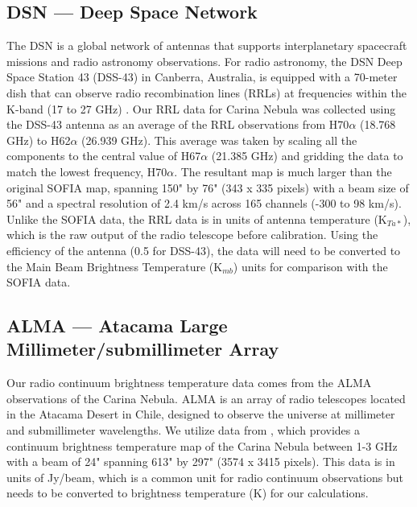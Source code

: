 \subsection{DSN --- Deep Space Network}
The DSN is a global network of antennas that supports interplanetary spacecraft missions and radio astronomy observations.
For radio astronomy, the DSN Deep Space Station 43 (DSS-43) in Canberra, Australia, is equipped with a 70-meter dish that can observe radio recombination lines (RRLs) at frequencies within the K-band (17 to 27 GHz) \citep{virkler2020broadband}.
Our RRL data for Carina Nebula was collected using the DSS-43 antenna as an average of the RRL observations from H70$\alpha$ (18.768 GHz) to H62$\alpha$ (26.939 GHz).
This average was taken by scaling all the components to the central value of H67$\alpha$ (21.385 GHz) and gridding the data to match the lowest frequency, H70$\alpha$.
The resultant map is much larger than the original SOFIA map, spanning 150" by 76" (343 x 335 pixels) with a beam size of 56" and a spectral resolution of 2.4 km/s across 165 channels (-300 to 98 km/s).
Unlike the SOFIA data, the RRL data is in units of antenna temperature (K$_{Ta*}$), which is the raw output of the radio telescope before calibration.
Using the efficiency of the antenna (0.5 for DSS-43), the data will need to be converted to the Main Beam Brightness Temperature (K$_{mb}$) units for comparison with the SOFIA data.

\subsection{ALMA --- Atacama Large Millimeter/submillimeter Array}
Our radio continuum brightness temperature data comes from the ALMA observations of the Carina Nebula.
ALMA is an array of radio telescopes located in the Atacama Desert in Chile, designed to observe the universe at millimeter and submillimeter wavelengths.
We utilize data from \cite{Rebolledo_2021}, which provides a continuum brightness temperature map of the Carina Nebula between 1-3 GHz with a beam of 24" spanning 613" by 297" (3574 x 3415 pixels).
This data is in units of Jy/beam, which is a common unit for radio continuum observations but needs to be converted to brightness temperature (K) for our calculations.

